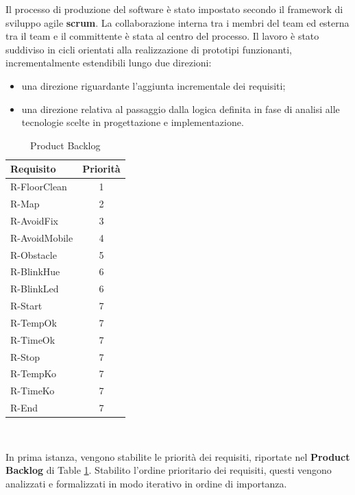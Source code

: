 \documentclass{llncs}
\begin{document}
Il processo di produzione del software è stato impostato secondo il framework di sviluppo agile \textbf{scrum}. La collaborazione interna tra i membri del team ed esterna tra il team e il committente è stata al centro del processo. Il lavoro è stato suddiviso in cicli orientati alla realizzazione di prototipi funzionanti, incrementalmente estendibili lungo due direzioni:
\begin{itemize}
	\setlength\itemsep{0em}
	\item una direzione riguardante l'aggiunta incrementale dei requisiti;
	\item una direzione relativa al passaggio dalla logica definita in fase di analisi alle tecnologie scelte in progettazione e implementazione.
\end{itemize}

\begin{table}
	\centering
	\begin{tabular}{|l|c|}
		\hline \textbf{Requisito} & \textbf{Priorità} \\ \hline
		R-FloorClean & 1 \\ \hline
		R-Map & 2 \\ \hline
		R-AvoidFix & 3 \\ \hline
		R-AvoidMobile & 4 \\ \hline
		R-Obstacle & 5 \\ \hline
		R-BlinkHue & 6 \\ \hline
		R-BlinkLed & 6 \\ \hline
		R-Start & 7 \\ \hline
		R-TempOk & 7 \\ \hline
		R-TimeOk & 7 \\ \hline
		R-Stop & 7 \\ \hline
		R-TempKo & 7 \\ \hline
		R-TimeKo & 7 \\ \hline
		R-End & 7 \\ \hline
	\end{tabular} 
	\\[1\baselineskip]
	\caption{Product Backlog}
	\label{tab:pb}
\end{table}
In prima istanza, vengono stabilite le priorità dei requisiti, riportate nel \textbf{Product Backlog} di Table \ref{tab:pb}.
Stabilito l'ordine prioritario dei requisiti, questi vengono analizzati e formalizzati in modo iterativo in ordine di importanza.
\end{document}
